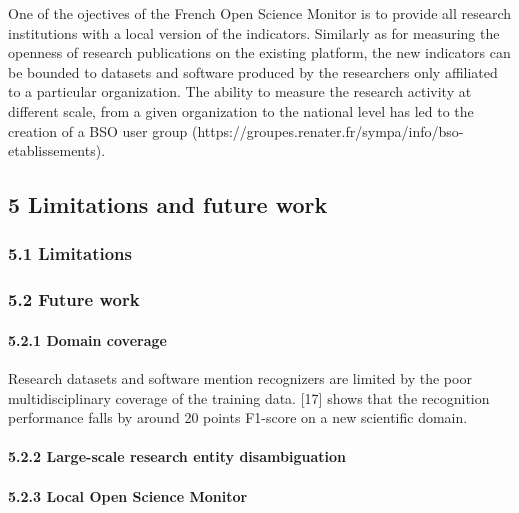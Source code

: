 \documentclass[
]{article}
\begin{document}
One of the ojectives of the French Open Science Monitor is to provide
all research institutions with a local version of the indicators.
Similarly as for measuring the openness of research publications on the
existing platform, the new indicators can be bounded to datasets and
software produced by the researchers only affiliated to a particular
organization. The ability to measure the research activity at different
scale, from a given organization to the national level has led to the
creation of a BSO user group
(https://groupes.renater.fr/sympa/info/bso-etablissements).

\hypertarget{limitations-and-future-work}{%
\subsection{5 Limitations and future
work}\label{limitations-and-future-work}}

\hypertarget{limitations}{%
\subsubsection{5.1 Limitations}\label{limitations}}

\hypertarget{future-work}{%
\subsubsection{5.2 Future work}\label{future-work}}

\hypertarget{domain-coverage}{%
\paragraph{5.2.1 Domain coverage}\label{domain-coverage}}

Research datasets and software mention recognizers are limited by the
poor multidisciplinary coverage of the training data. {[}17{]} shows
that the recognition performance falls by around 20 points F1-score on a
new scientific domain.

\hypertarget{large-scale-research-entity-disambiguation}{%
\paragraph{5.2.2 Large-scale research entity
disambiguation}\label{large-scale-research-entity-disambiguation}}

\hypertarget{local-open-science-monitor}{%
\paragraph{5.2.3 Local Open Science
Monitor}\label{local-open-science-monitor}}
\end{document}

